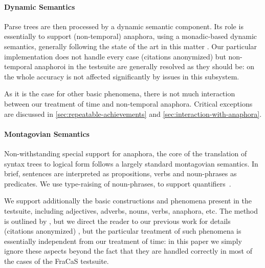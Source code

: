 \documentclass[a4paper,twoside]{article}
\begin{document}
\paragraph{Dynamic Semantics}
Parse trees are then processed by a dynamic semantic component.
Its role is essentially to support  (non-temporal) anaphora, using a
monadic-based dynamic semantics, generally following the state of the
art in this matter
\citep{unger_dynamic_2011,charlow_monadic_2015,charlow_modular_2017}.
Our particular implementation does not handle every case \ifanon
(citations anonymized) \else \citet{bernardy_computational_2020,bernardy_wide-coverage_2019} \fi
but non-temporal anaphoroi in the testsuite are generally resolved as
they should be: on the whole accuracy is not affected significantly by
issues in this subsystem.

As it is the case for other basic phenomena, there is not much
interaction between our treatment of time and non-temporal
anaphora. Critical exceptions are discussed in
\cref{sec:repeatable-achievements} and \cref{sec:interaction-with-anaphora}.


\paragraph{Montagovian Semantics}
Non-withstanding special support for anaphora, the core of the translation of syntax trees
to logical form follows a largely standard
montagovian semantics. In brief, sentences are interpreted as
propositions, verbs and noun-phrases as predicates.  We use
type-raising of noun-phrases, to support
quantifiers~\citep{montague_proper_1974}.

We support additionally the basic constructions and phenomena present
in the testsuite, including adjectives, adverbs, nouns, verbs,
anaphora, etc. The method is outlined by
\citet{montague_english_1970,montague_proper_1973}, but we direct the
reader to our previous work for details \ifanon (citations anonymized)
\else \citet{bernardy_type-theoretical_2017,bernardy_wide-coverage_2019} \fi, but the particular
treatment of such phenomena is essentially independent from our
treatment of time: in this paper we simply ignore these aspects beyond
the fact that they are handled correctly in most of the cases of the
FraCaS testsuite.
\end{document}

